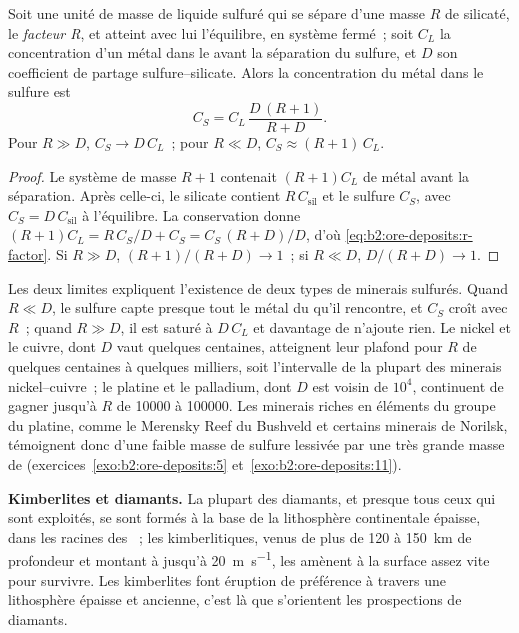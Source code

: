 \begin{proposition}[Facteur R]\label{prop:b2:ore-deposits:r-factor}
Soit une unité de masse de liquide sulfuré qui se sépare d'une masse $R$ de  silicaté, le
\emph{facteur R}, et atteint avec lui l'équilibre, en système fermé~; soit
$C_L$ la concentration d'un métal dans le  avant la séparation du sulfure, et $D$ son coefficient
de partage sulfure--silicate. Alors la concentration du métal dans le sulfure est
\begin{equation}
C_S = C_L\,\frac{D\,(R + 1)}{R + D} .
\label{eq:b2:ore-deposits:r-factor}
\end{equation}
Pour $R \gg D$, $C_S \to D\,C_L$~; pour $R \ll D$, $C_S \approx (R + 1)\,C_L$.
\end{proposition}

\begin{proof}
Le système de masse $R + 1$ contenait $(R + 1)C_L$ de métal avant la séparation. Après celle-ci, le silicate
contient $R\,C_{\mathrm{sil}}$ et le sulfure $C_S$, avec $C_S = D\,C_{\mathrm{sil}}$ à l'équilibre.
La conservation donne $(R + 1)C_L = R\,C_S/D + C_S = C_S\,(R + D)/D$, d'où
\eqref{eq:b2:ore-deposits:r-factor}. Si $R \gg D$, $(R + 1)/(R + D) \to 1$~; si $R \ll D$,
$D/(R + D) \to 1$.
\end{proof}

Les deux limites expliquent l'existence de deux types de minerais sulfurés. Quand $R \ll D$, le sulfure
capte presque tout le métal du  qu'il rencontre, et $C_S$ croît avec $R$~; quand $R \gg D$, il est
saturé à $D\,C_L$ et davantage de  n'ajoute rien. Le nickel et le cuivre, dont $D$ vaut quelques
centaines, atteignent leur plafond pour $R$ de quelques centaines à quelques milliers, soit l'intervalle
de la plupart des minerais nickel--cuivre~; le platine et le palladium, dont $D$ est voisin de $10^4$,
continuent de gagner jusqu'à $R$ de \num{10000} à \num{100000}. Les minerais riches en éléments du
groupe du platine, comme le Merensky Reef du Bushveld et certains minerais de Norilsk, témoignent donc
d'une faible masse de sulfure lessivée par une très grande masse de  (exercices~\ref{exo:b2:ore-deposits:5} et~\ref{exo:b2:ore-deposits:11}).

\textbf{Kimberlites et diamants.} La plupart des diamants, et presque tous ceux qui sont exploités,
se sont formés à la base de la lithosphère continentale épaisse, dans les racines des ~; les
 kimberlitiques, venus de plus de 120 à \qty{150}{km} de profondeur et montant à jusqu'à
\qty{20}{m.s^{-1}}, les amènent à la surface assez vite pour survivre. Les kimberlites font éruption
de préférence à travers une lithosphère épaisse et ancienne, c'est là que s'orientent les prospections de diamants.

